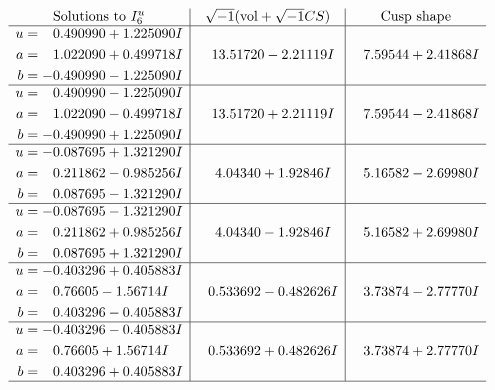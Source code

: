 \documentclass[1p]{elsarticle_modified}
\theoremstyle{definition}
\newcommand{\I}{\sqrt{-1}}
\begin{document}
$$\begin{array}{c|c|c}  
\text{Solutions to }I^u_{6}& \I (\text{vol} + \sqrt{-1}CS) & \text{Cusp shape}\\
 \hline 
\begin{aligned}
u &= \phantom{-}0.490990 + 1.225090 I \\
a &= \phantom{-}1.022090 + 0.499718 I \\
b &= -0.490990 - 1.225090 I\end{aligned}
 & \phantom{-}13.51720 - 2.21119 I & \phantom{-}7.59544 + 2.41868 I \\ \hline\begin{aligned}
u &= \phantom{-}0.490990 - 1.225090 I \\
a &= \phantom{-}1.022090 - 0.499718 I \\
b &= -0.490990 + 1.225090 I\end{aligned}
 & \phantom{-}13.51720 + 2.21119 I & \phantom{-}7.59544 - 2.41868 I \\ \hline\begin{aligned}
u &= -0.087695 + 1.321290 I \\
a &= \phantom{-}0.211862 - 0.985256 I \\
b &= \phantom{-}0.087695 - 1.321290 I\end{aligned}
 & \phantom{-}4.04340 + 1.92846 I & \phantom{-}5.16582 - 2.69980 I \\ \hline\begin{aligned}
u &= -0.087695 - 1.321290 I \\
a &= \phantom{-}0.211862 + 0.985256 I \\
b &= \phantom{-}0.087695 + 1.321290 I\end{aligned}
 & \phantom{-}4.04340 - 1.92846 I & \phantom{-}5.16582 + 2.69980 I \\ \hline\begin{aligned}
u &= -0.403296 + 0.405883 I \\
a &= \phantom{-}0.76605 - 1.56714 I \\
b &= \phantom{-}0.403296 - 0.405883 I\end{aligned}
 & \phantom{-}0.533692 - 0.482626 I & \phantom{-}3.73874 - 2.77770 I \\ \hline\begin{aligned}
u &= -0.403296 - 0.405883 I \\
a &= \phantom{-}0.76605 + 1.56714 I \\
b &= \phantom{-}0.403296 + 0.405883 I\end{aligned}
 & \phantom{-}0.533692 + 0.482626 I & \phantom{-}3.73874 + 2.77770 I\\
 \hline 
 \end{array}$$\newpage\newpage\renewcommand{\arraystretch}{1}
\end{document}
